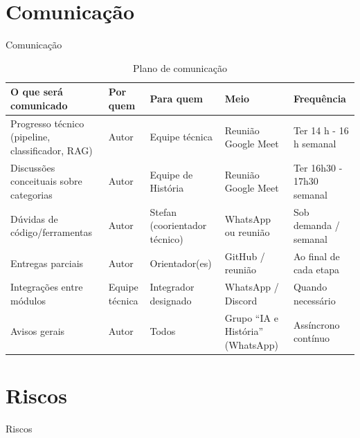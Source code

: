 \section{\textbf{Comunicação}}{Comunicação}\label{comunicauxe7uxe3o}

\begin{table}[htbp]
  \small
  \caption{Plano de comunicação}                  %
  \label{tab:comunicacao}
  \centering
  \begin{tabularx}{\linewidth}{@{}>{\RaggedRight\arraybackslash}p{4.8cm}
                                    >{\RaggedRight\arraybackslash}p{1.6cm}
                                    >{\RaggedRight\arraybackslash}p{2.4cm}
                                    >{\RaggedRight\arraybackslash}p{2.8cm}
                                    >{\RaggedRight\arraybackslash}X@{}}
    \toprule
    O que será comunicado & Por quem & Para quem & Meio & Frequência \\ \midrule
    Progresso técnico (pipeline, classificador, RAG) & Autor & Equipe técnica & Reunião Google Meet & Ter 14 h - 16 h semanal \\[2pt]
    Discussões conceituais sobre categorias & Autor & Equipe de História & Reunião Google Meet & Ter 16h30 - 17h30 semanal \\[2pt]
    Dúvidas de código/ferramentas & Autor & Stefan (coorientador técnico) & WhatsApp ou reunião & Sob demanda / semanal \\[2pt]
    Entregas parciais & Autor & Orientador(es) & GitHub / reunião & Ao final de cada etapa \\[2pt]
    Integrações entre módulos & Equipe técnica & Integrador designado & WhatsApp / Discord & Quando necessário \\[2pt]
    Avisos gerais & Autor & Todos & Grupo “IA e História” (WhatsApp) & Assíncrono contínuo \\ \bottomrule
  \end{tabularx}
\end{table}

\section{\textbf{Riscos}}{Riscos}\label{riscos}

